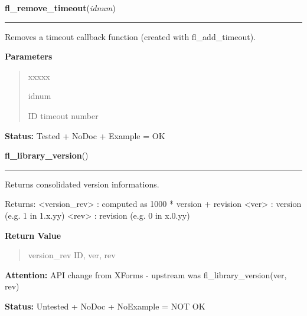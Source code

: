 \hspace{.8\funcindent}\begin{boxedminipage}{\funcwidth}

    \raggedright \textbf{fl\_remove\_timeout}(\textit{idnum})

    \vspace{-1.5ex}

    \rule{\textwidth}{0.5\fboxrule}
\setlength{\parskip}{2ex}
    Removes a timeout callback function (created with fl\_add\_timeout).

\setlength{\parskip}{1ex}
      \textbf{Parameters}
      \vspace{-1ex}

      \begin{quote}
        \begin{Ventry}{xxxxx}

          \item[idnum]

          ID timeout number

        \end{Ventry}

      \end{quote}

\textbf{Status:} Tested + NoDoc + Example = OK



    \end{boxedminipage}

    \label{xformslib:library:fl_library_version}

    \vspace{0.5ex}

\hspace{.8\funcindent}\begin{boxedminipage}{\funcwidth}

    \raggedright \textbf{fl\_library\_version}()

    \vspace{-1.5ex}

    \rule{\textwidth}{0.5\fboxrule}
\setlength{\parskip}{2ex}
    Returns consolidated version informations.

    Returns: {\textless}version\_rev{\textgreater} : computed as 1000 * 
    version + revision {\textless}ver{\textgreater} : version (e.g. 1 in 
    1.x.yy) {\textless}rev{\textgreater} : revision (e.g. 0 in x.0.yy)

\setlength{\parskip}{1ex}
      \textbf{Return Value}
    \vspace{-1ex}

      \begin{quote}
      version\_rev ID, ver, rev

      \end{quote}

\textbf{Attention:} API change from XForms - upstream was fl\_library\_version(ver, rev)



\textbf{Status:} Untested + NoDoc + NoExample = NOT OK



    \end{boxedminipage}

